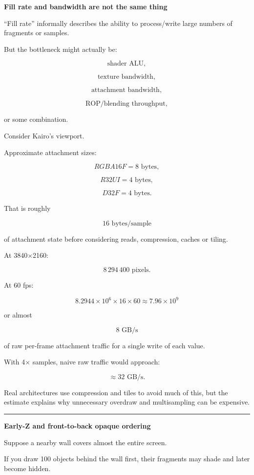 \textbf{Fill rate and bandwidth are not the same thing}

``Fill rate'' informally describes the ability to process/write large numbers of fragments or samples.

But the bottleneck might actually be:

\[
\text{shader ALU},
\]

\[
\text{texture bandwidth},
\]

\[
\text{attachment bandwidth},
\]

\[
\text{ROP/blending throughput},
\]

or some combination.

Consider Kairo's viewport.

Approximate attachment sizes:

\[
RGBA16F = 8\text{ bytes},
\]

\[
R32UI = 4\text{ bytes},
\]

\[
D32F = 4\text{ bytes}.
\]

That is roughly

\[
16\text{ bytes/sample}
\]

of attachment state before considering reads, compression, caches or tiling.

At 3840×2160:

\[
8\,294\,400\text{ pixels}.
\]

At 60 fps:

\[
8.2944\times10^6
\times16
\times60
\approx7.96\times10^9
\]

or almost

\[
\boxed{8\text{ GB/s}}
\]

of raw per-frame attachment traffic for a single write of each value.

With 4× samples, naive raw traffic would approach:

\[
\approx32\text{ GB/s}.
\]

Real architectures use compression and tiles to avoid much of this, but the estimate explains why unnecessary overdraw and multisampling can be expensive.

\begin{center}\rule{0.5\linewidth}{0.5pt}\end{center}

\textbf{Early-Z and front-to-back opaque ordering}

Suppose a nearby wall covers almost the entire screen.

If you draw 100 objects behind the wall first, their fragments may shade and later become hidden.

